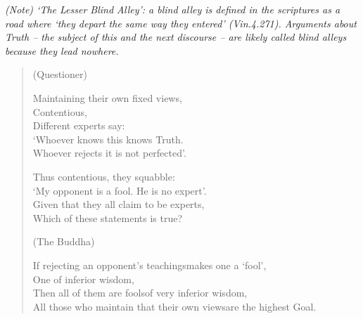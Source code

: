 
\noindent\textit{(Note) `The Lesser Blind Alley': a blind alley is defined in the scriptures as a road where `they depart the same way they entered' (Vin.4.271). Arguments about Truth -- the subject of this and the next discourse -- are likely called blind alleys because they lead nowhere.}

\begin{verse}

(Questioner)

 Maintaining their own fixed views,\\
Contentious,\\
Different experts say:\\
`Whoever knows this knows Truth.\\
Whoever rejects it is not perfected'.


 Thus contentious, they squabble:\\
`My opponent is a fool. He is no expert'.\\
Given that they all claim to be experts,\\
Which of these statements is true?


(The Buddha)

 If rejecting an opponent's teachings\newline makes one a `fool',\\
One of inferior wisdom,\\
Then all of them are fools\newline of very inferior wisdom,\\
All those who maintain that their own views\newline are the highest Goal.


\end{verse}
